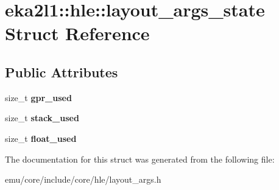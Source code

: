 \hypertarget{structeka2l1_1_1hle_1_1layout__args__state}{}\section{eka2l1\+:\+:hle\+:\+:layout\+\_\+args\+\_\+state Struct Reference}
\label{structeka2l1_1_1hle_1_1layout__args__state}
\subsection*{Public Attributes}
\begin{DoxyCompactItemize}
\item 
\mbox{\label{structeka2l1_1_1hle_1_1layout__args__state_a17f63b6e118228543998643139dcab71}} 
size\+\_\+t {\bfseries gpr\+\_\+used}
\item 
\mbox{\label{structeka2l1_1_1hle_1_1layout__args__state_ae402086263c931f1b851806e83e6f4a0}} 
size\+\_\+t {\bfseries stack\+\_\+used}
\item 
\mbox{\label{structeka2l1_1_1hle_1_1layout__args__state_a16f7d295be19e72740bda3362abbb0fb}} 
size\+\_\+t {\bfseries float\+\_\+used}
\end{DoxyCompactItemize}


The documentation for this struct was generated from the following file\+:\begin{DoxyCompactItemize}
\item 
emu/core/include/core/hle/layout\+\_\+args.\+h\end{DoxyCompactItemize}
